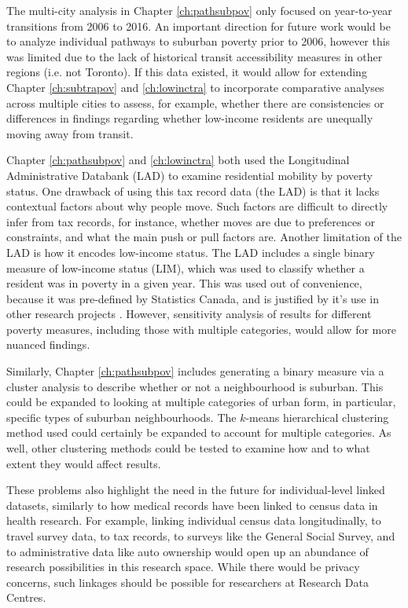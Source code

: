 The multi-city analysis in Chapter \ref{ch:pathsubpov} only focused on year-to-year transitions from 2006 to 2016. An important direction for future work would be to analyze individual pathways to suburban poverty prior to 2006, however this was limited due to the lack of historical transit accessibility measures in other regions (i.e. not Toronto). If this data existed, it would allow for extending Chapter \ref{ch:subtrapov} and \ref{ch:lowinctra} to incorporate comparative analyses across multiple cities to assess, for example, whether there are consistencies or differences in findings regarding whether low-income residents are unequally moving away from transit.

Chapter \ref{ch:pathsubpov} and \ref{ch:lowinctra} both used the Longitudinal Administrative Databank (LAD) to examine residential mobility by poverty status. One drawback of using this tax record data (the LAD) is that it lacks contextual factors about why people move. Such factors are difficult to directly infer from tax records, for instance, whether moves are due to preferences or constraints, and what the main push or pull factors are. Another limitation of the LAD is how it encodes low-income status. The LAD includes a single binary measure of low-income status (LIM), which was used to classify whether a resident was in poverty in a given year. This was used out of convenience, because it was pre-defined by Statistics Canada, and is justified by it's use in other research projects \cite{picot_immigration_2014,allen_sizing_2019,brown_money_2019}. However, sensitivity analysis of results for different poverty measures, including those with multiple categories, would allow for more nuanced findings. 

Similarly, Chapter \ref{ch:pathsubpov} includes generating a binary measure via a cluster analysis to describe whether or not a neighbourhood is suburban. This could be expanded to looking at multiple categories of urban form, in particular, specific types of suburban neighbourhoods. The $k$-means hierarchical clustering method used could certainly be expanded to account for multiple categories. As well, other clustering methods could be tested to examine how and to what extent they would affect results.

These problems also highlight the need in the future for individual-level linked datasets, similarly to how medical records have been linked to census data in health research. For example, linking individual census data longitudinally, to travel survey data, to tax records, to surveys like the General Social Survey, and to administrative data like auto ownership would open up an abundance of research possibilities in this research space. While there would be privacy concerns, such linkages should be possible for researchers at Research Data Centres.



